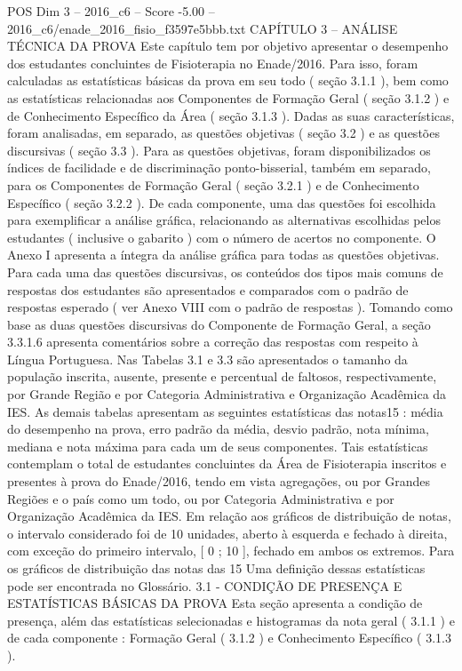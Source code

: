 \begin{textsample}{POS Dim 3 – 2016\_c6 – Score -5.00 – 2016\_c6/enade\_2016\_fisio\_f3597e5bbb.txt}  \label{ex:f3_pos_253}
CAPÍTULO 3 – ANÁLISE TÉCNICA DA PROVA Este capítulo tem por objetivo apresentar o desempenho dos estudantes concluintes de Fisioterapia no Enade/2016.
Para isso, foram calculadas as estatísticas básicas da prova em seu todo ( seção 3.1.1 ), bem como as estatísticas relacionadas aos Componentes de Formação Geral ( seção 3.1.2 ) e de Conhecimento Específico da Área ( seção 3.1.3 ).
Dadas as suas características, foram analisadas, em separado, as questões objetivas ( seção 3.2 ) e as questões discursivas ( seção 3.3 ).
Para as questões objetivas, foram disponibilizados os índices de facilidade e de discriminação ponto-bisserial, também em separado, para os Componentes de Formação Geral ( seção 3.2.1 ) e de Conhecimento Específico ( seção 3.2.2 ).
De cada componente, uma das questões foi escolhida para exemplificar a análise gráfica, relacionando as alternativas escolhidas pelos estudantes ( inclusive o gabarito ) com o número de acertos no componente.
O Anexo I apresenta a íntegra da análise gráfica para todas as questões objetivas.
Para cada uma das questões discursivas, os conteúdos dos tipos mais comuns de respostas dos estudantes são apresentados e comparados com o padrão de respostas esperado ( ver Anexo VIII com o padrão de respostas ).
Tomando como base as duas questões discursivas do Componente de Formação Geral, a seção 3.3.1.6 apresenta comentários sobre a correção das respostas com respeito à Língua Portuguesa.
Nas Tabelas 3.1 e 3.3 são apresentados o tamanho da população inscrita, ausente, presente e percentual de faltosos, respectivamente, por Grande Região e por Categoria Administrativa e Organização Acadêmica da IES.
As demais tabelas apresentam as seguintes estatísticas das notas15 : média do desempenho na prova, erro padrão da média, desvio padrão, nota mínima, mediana e nota máxima para cada um de seus componentes.
Tais estatísticas contemplam o total de estudantes concluintes da Área de Fisioterapia inscritos e presentes à prova do Enade/2016, tendo em vista agregações, ou por Grandes Regiões e o país como um todo, ou por Categoria Administrativa e por Organização Acadêmica da IES.
Em relação aos gráficos de distribuição de notas, o intervalo considerado foi de 10 unidades, aberto à esquerda e fechado à direita, com exceção do primeiro intervalo, [ 0 ; 10 ], fechado em ambos os extremos.
Para os gráficos de distribuição das notas das 15 Uma definição dessas estatísticas pode ser encontrada no Glossário. 3.1 - CONDIÇÃO DE PRESENÇA E ESTATÍSTICAS BÁSICAS DA PROVA Esta seção apresenta a condição de presença, além das estatísticas selecionadas e histogramas da nota geral ( 3.1.1 ) e de cada componente : Formação Geral ( 3.1.2 ) e Conhecimento Específico ( 3.1.3 ).

\end{textsample}
